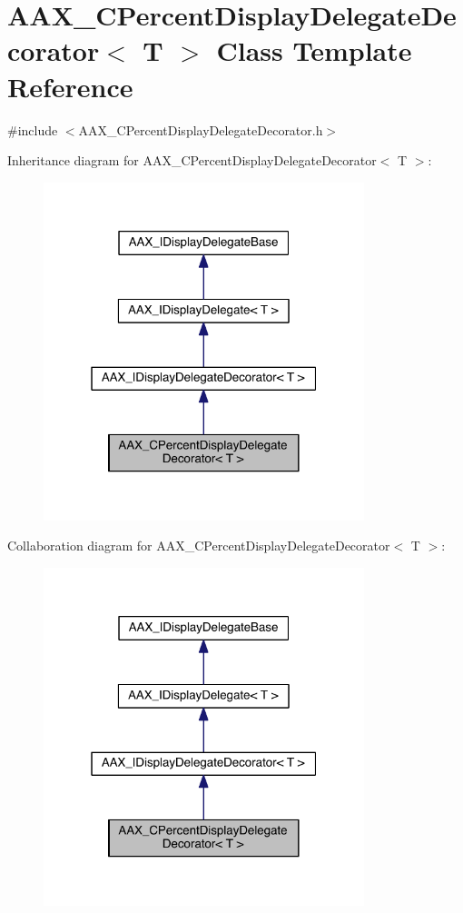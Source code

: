 \hypertarget{a00036}{}\section{A\+A\+X\+\_\+\+C\+Percent\+Display\+Delegate\+Decorator$<$ T $>$ Class Template Reference}
\label{a00036}


{\ttfamily \#include $<$A\+A\+X\+\_\+\+C\+Percent\+Display\+Delegate\+Decorator.\+h$>$}



Inheritance diagram for A\+A\+X\+\_\+\+C\+Percent\+Display\+Delegate\+Decorator$<$ T $>$\+:
\nopagebreak
\begin{figure}[H]
\begin{center}
\leavevmode
\includegraphics[width=265pt]{a00455}
\end{center}
\end{figure}


Collaboration diagram for A\+A\+X\+\_\+\+C\+Percent\+Display\+Delegate\+Decorator$<$ T $>$\+:
\nopagebreak
\begin{figure}[H]
\begin{center}
\leavevmode
\includegraphics[width=265pt]{a00456}
\end{center}
\end{figure}



